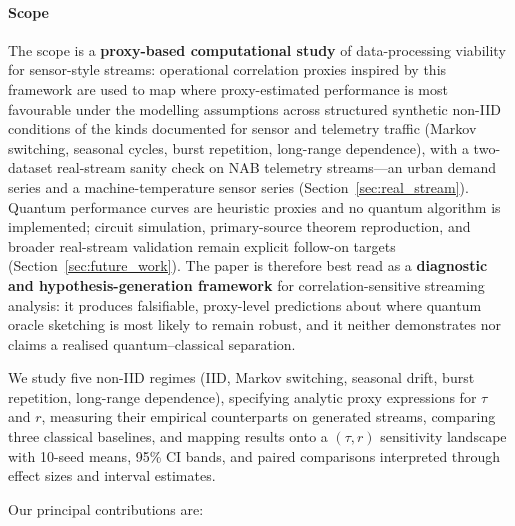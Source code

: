 \documentclass[sensors,article,submit,pdftex,moreauthors]{Definitions/mdpi}
\providecommand{\DIFadd}[1]{{\protect\color{blue}#1}} %
\providecommand{\DIFdel}[1]{} %
\providecommand{\DIFaddbegin}{} %
\providecommand{\DIFaddend}{} %
\providecommand{\DIFdelbegin}{} %
\providecommand{\DIFdelend}{} %
\begin{document}
\paragraph{Scope} The scope is a \textbf{proxy-based computational study} of data-processing viability for sensor-style streams: operational correlation proxies inspired by this framework are used to map where proxy-estimated performance is most favourable under the modelling assumptions across structured synthetic non\nobreakdash-IID conditions of the kinds documented for sensor and telemetry traffic (Markov switching, seasonal cycles, burst repetition, long-range dependence), with a two\nobreakdash-dataset real-stream sanity check on NAB telemetry streams---an urban demand series and a machine-temperature sensor series (Section~\ref{sec:real_stream}). Quantum performance curves are heuristic proxies and no quantum algorithm is implemented; circuit simulation, primary-source theorem reproduction, and broader real-stream validation remain explicit follow-on targets (Section~\ref{sec:future_work}). \DIFaddbegin \DIFadd{The paper is therefore best read as a }\textbf{\DIFadd{diagnostic and hypothesis-generation framework}} \DIFadd{for correlation-sensitive streaming analysis: it produces falsifiable, proxy-level predictions about where quantum oracle sketching is most likely to remain robust, and it neither demonstrates nor claims a realised quantum--classical separation.
}\DIFaddend 

We study five non\nobreakdash-IID regimes (IID, Markov switching, seasonal drift, burst repetition, long-range dependence), specifying analytic proxy expressions for $\tau$ and $r$, measuring their empirical counterparts on generated streams, comparing three classical baselines, and mapping results onto a $(\tau, r)$ sensitivity landscape with 10-seed means, 95\% CI bands, and paired \DIFdelbegin \DIFdel{Wilcoxon tests}\DIFdelend \DIFaddbegin \DIFadd{comparisons interpreted through effect sizes and interval estimates}\DIFaddend .

Our principal contributions are:
\end{document}
